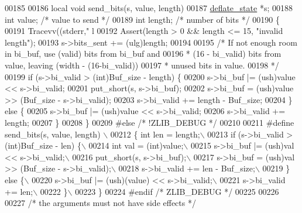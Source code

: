 \begin{DoxyCode}
{00185 
00186 local \textcolor{keywordtype}{void} send\_bits(s, value, length)
00187     \hyperlink{structinternal__state}{deflate\_state} *s;
00188     \textcolor{keywordtype}{int} value;  \textcolor{comment}{/* value to send */}
00189     \textcolor{keywordtype}{int} length; \textcolor{comment}{/* number of bits */}
00190 \{
00191     Tracevv((stderr,\textcolor{stringliteral}{" l %
00192     Assert(length > 0 && length <= 15, \textcolor{stringliteral}{"invalid length"});
00193     s->bits\_sent += (ulg)length;
00194 
00195     \textcolor{comment}{/* If not enough room in bi\_buf, use (valid) bits from bi\_buf and}
00196 \textcolor{comment}{     * (16 - bi\_valid) bits from value, leaving (width - (16-bi\_valid))}
00197 \textcolor{comment}{     * unused bits in value.}
00198 \textcolor{comment}{     */}
00199     \textcolor{keywordflow}{if} (s->bi\_valid > (\textcolor{keywordtype}{int})Buf\_size - length) \{
00200         s->bi\_buf |= (ush)value << s->bi\_valid;
00201         put\_short(s, s->bi\_buf);
00202         s->bi\_buf = (ush)value >> (Buf\_size - s->bi\_valid);
00203         s->bi\_valid += length - Buf\_size;
00204     \} \textcolor{keywordflow}{else} \{
00205         s->bi\_buf |= (ush)value << s->bi\_valid;
00206         s->bi\_valid += length;
00207     \}
00208 \}
00209 \textcolor{preprocessor}{#else }\textcolor{comment}{/* !ZLIB\_DEBUG */}\textcolor{preprocessor}{}
00210 
00211 \textcolor{preprocessor}{#define send\_bits(s, value, length) \(\backslash\)}
00212 \textcolor{preprocessor}{\{ int len = length;\(\backslash\)}
00213 \textcolor{preprocessor}{  if (s->bi\_valid > (int)Buf\_size - len) \{\(\backslash\)}
00214 \textcolor{preprocessor}{    int val = (int)value;\(\backslash\)}
00215 \textcolor{preprocessor}{    s->bi\_buf |= (ush)val << s->bi\_valid;\(\backslash\)}
00216 \textcolor{preprocessor}{    put\_short(s, s->bi\_buf);\(\backslash\)}
00217 \textcolor{preprocessor}{    s->bi\_buf = (ush)val >> (Buf\_size - s->bi\_valid);\(\backslash\)}
00218 \textcolor{preprocessor}{    s->bi\_valid += len - Buf\_size;\(\backslash\)}
00219 \textcolor{preprocessor}{  \} else \{\(\backslash\)}
00220 \textcolor{preprocessor}{    s->bi\_buf |= (ush)(value) << s->bi\_valid;\(\backslash\)}
00221 \textcolor{preprocessor}{    s->bi\_valid += len;\(\backslash\)}
00222 \textcolor{preprocessor}{  \}\(\backslash\)}
00223 \textcolor{preprocessor}{\}}
00224 \textcolor{preprocessor}{#endif }\textcolor{comment}{/* ZLIB\_DEBUG */}\textcolor{preprocessor}{}
00225 
00226 
00227 \textcolor{comment}{/* the arguments must not have side effects */}
}}
\end{DoxyCode}
